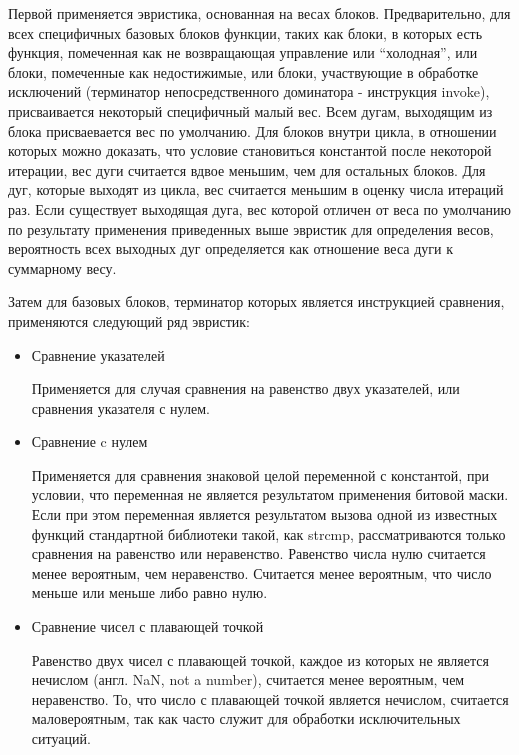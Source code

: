 Первой применяется эвристика, основанная на весах блоков.
Предварительно, для всех специфичных базовых блоков функции, таких как блоки, в которых есть функция, помеченная как не возвращающая управление или \enquote{холодная}, или блоки, помеченные как недостижимые, или блоки, участвующие в обработке исключений (терминатор непосредственного доминатора - инструкция invoke), присваивается некоторый специфичный малый вес.
Всем дугам, выходящим из блока присваевается вес по умолчанию.
Для блоков внутри цикла, в отношении которых можно доказать, что условие становиться константой после некоторой итерации, вес дуги считается вдвое меньшим, чем для остальных блоков.
Для дуг, которые выходят из цикла, вес считается меньшим в оценку числа итераций раз.
Если существует выходящая дуга, вес которой отличен от веса по умолчанию по результату применения приведенных выше эвристик для определения весов, вероятность всех выходных дуг определяется как отношение веса дуги к суммарному весу.

Затем для базовых блоков, терминатор которых является инструкцией сравнения, применяются следующий ряд эвристик:
\begin{itemize}
    \item Сравнение указателей

        Применяется для случая сравнения на равенство двух указателей, или сравнения указателя с нулем.

    \item Сравнение c нулем

        Применяется для сравнения знаковой целой переменной с константой, при условии, что переменная не является результатом применения битовой маски.
        Если при этом переменная является результатом вызова одной из известных функций стандартной библиотеки такой, как strcmp, рассматриваются только сравнения на равенство или неравенство.
        Равенство числа нулю считается менее вероятным, чем неравенство.
        Считается менее вероятным, что число меньше или меньше либо равно нулю.

    \item Сравнение чисел с плавающей точкой

        Равенство двух чисел с плавающей точкой, каждое из которых не является нечислом (англ. NaN, not a number), считается менее вероятным, чем неравенство.
        То, что число с плавающей точкой является нечислом, считается маловероятным, так как часто служит для обработки исключительных ситуаций.

\end{itemize}

